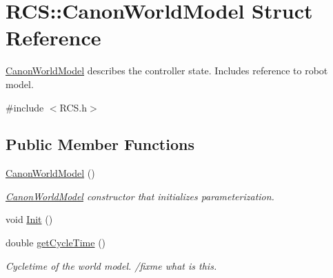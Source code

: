 \hypertarget{structRCS_1_1CanonWorldModel}{\section{R\-C\-S\-:\-:Canon\-World\-Model Struct Reference}
\label{structRCS_1_1CanonWorldModel}
}


\hyperlink{structRCS_1_1CanonWorldModel}{Canon\-World\-Model} describes the controller state. Includes reference to robot model.  




{\ttfamily \#include $<$R\-C\-S.\-h$>$}

\subsection*{Public Member Functions}
\begin{DoxyCompactItemize}
\item 
\hyperlink{structRCS_1_1CanonWorldModel_aaae0721930b3b79a12c7b397418ab400}{Canon\-World\-Model} ()
\begin{DoxyCompactList}\small\item\em \hyperlink{structRCS_1_1CanonWorldModel}{Canon\-World\-Model} constructor that initializes parameterization. \end{DoxyCompactList}\item 
void \hyperlink{structRCS_1_1CanonWorldModel_a0a796ab8aee018cbd9004f609f728444}{Init} ()
\item 
double \hyperlink{structRCS_1_1CanonWorldModel_abf7a5bb962de85a5e1946148adce31b0}{get\-Cycle\-Time} ()
\begin{DoxyCompactList}\small\item\em Cycletime of the world model. /fixme what is this. \end{DoxyCompactList}\end{DoxyCompactItemize}
